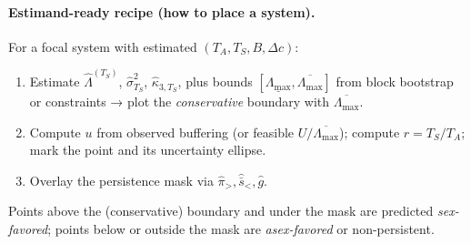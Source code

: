 \documentclass[11pt]{article}
\theoremstyle{upright}
\newcommand{\horizon}{\Lambda}
\newcommand{\Lmax}{\horizon^{(T)}_{\max}}
\renewcommand{\Lmax}{\Lambda_{\max}}
\begin{document}
\paragraph{Estimand-ready recipe (how to place a system).}
For a focal system with estimated $(T_A,T_S,B,\Delta c)$:
\begin{enumerate}[label=(P\arabic*)]
\item Estimate $\widehat{\Lambda}^{(T_S)}$, $\widehat{\sigma}_{T_S}^2$, $\widehat{\kappa}_{3,T_S}$, plus bounds $[\underline{\Lmax},\overline{\Lmax}]$ from block bootstrap or constraints → plot the \emph{conservative} boundary with $\overline{\Lmax}$.
\item Compute $u$ from observed buffering (or feasible $U/\overline{\Lmax}$); compute $r=T_S/T_A$; mark the point and its uncertainty ellipse.
\item Overlay the persistence mask via $\widehat{\pi}_{>},\widehat{\bar s}_{<},\widehat g$.
\end{enumerate}
Points above the (conservative) boundary and under the mask are predicted \emph{sex-favored}; points below or outside the mask are \emph{asex-favored} or non-persistent.
\end{document}
